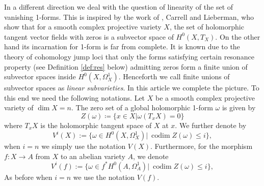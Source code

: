 \documentclass[a4paper,12pt,reqno]{amsart}
\theoremstyle{plain}
\theoremstyle{remark}
\newcommand{\C}{\mathbb C}
\newcommand{\codim}{\operatorname{codim}}
\begin{document}
In a different direction we deal with the question
of linearity of the set of vanishing 1-forms. This is
inspired by the work of  \cite{CL73}, Carrell and Lieberman, who show that for a smooth complex projective variety $X$, the set of holomorphic tangent vector fields with zeros is a subvector space of $H^0(X, T_X)$. On the
other hand its incarnation for 1-form is far from complete.
It is known due to the theory of cohomology jump
loci that only the forms satisfying certain resonance property (see Definition \ref{def:res} below) admitting zeros form
a finite union of subvector spaces inside $H^0(X, \Omega_X^1)$.
Henceforth we call finite unions of subvector spaces as \emph{linear subvarieties}.
In this article we complete the picture. To this end we need the 
following notations.
Let $X$ be a smooth complex projective variety of $\dim X=n$. The zero set of a global holomorphic 1-form $\omega$
is given by 
\[Z(\omega) \coloneqq \{x\in X| \omega(T_xX) = 0\}\]
where $T_xX$ is the holomorphic tangent space of $X$ at $x$. 
We further denote by 
\[V^i(X):=\{ \omega\in H^0(X, \Omega_X^1) |\ \codim Z(\omega)\leq i\},\] when $i=n$ we simply use the notation $V(X)$.
Furthermore, for the morphism $f:X\to A$ from $X$ to an abelian variety $A$, we denote
\[V^i(f):=\{ \omega\in f^*H^0(A, \Omega_A^1) |\ \codim Z(\omega)\leq i\},\]
As before when $i=n$ we use the notation $V(f)$.

\end{document}
